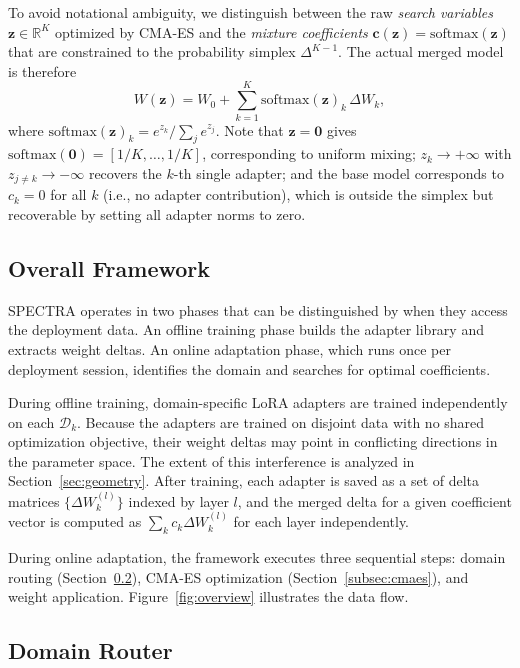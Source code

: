 \documentclass[preprint,12pt]{elsarticle}
\begin{document}
To avoid notational ambiguity, we distinguish between the raw \emph{search
variables} $\mathbf{z} \in \mathbb{R}^K$ optimized by CMA-ES and the
\emph{mixture coefficients} $\mathbf{c}(\mathbf{z}) = \mathrm{softmax}(\mathbf{z})$
that are constrained to the probability simplex $\Delta^{K-1}$. The actual
merged model is therefore
\begin{equation}
    W(\mathbf{z}) = W_0 + \sum_{k=1}^{K} \mathrm{softmax}(\mathbf{z})_k
    \,\Delta W_k,
    \label{eq:merge_z}
\end{equation}
where $\mathrm{softmax}(\mathbf{z})_k = e^{z_k}/\sum_j e^{z_j}$.
Note that $\mathbf{z} = \mathbf{0}$ gives
$\mathrm{softmax}(\mathbf{0}) = [1/K, \ldots, 1/K]$, corresponding to uniform
mixing; $z_k \to +\infty$ with $z_{j\neq k} \to -\infty$ recovers the $k$-th
single adapter; and the base model corresponds to $c_k = 0$ for all $k$
(i.e., no adapter contribution), which is outside the simplex but recoverable
by setting all adapter norms to zero.

\subsection{Overall Framework}
\label{subsec:framework}

SPECTRA operates in two phases that can be distinguished by when they access
the deployment data. An offline training phase builds the adapter library and
extracts weight deltas. An online adaptation phase, which runs once per
deployment session, identifies the domain and searches for optimal coefficients.

During offline training, domain-specific LoRA adapters are trained independently
on each $\mathcal{D}_k$. Because the adapters are trained on disjoint data with
no shared optimization objective, their weight deltas may point in conflicting
directions in the parameter space. The extent of this interference is analyzed
in Section~\ref{sec:geometry}. After training, each adapter is saved as a set
of delta matrices $\{\Delta W_k^{(l)}\}$ indexed by layer $l$, and the merged
delta for a given coefficient vector is computed as
$\sum_k c_k \Delta W_k^{(l)}$ for each layer independently.

During online adaptation, the framework executes three sequential steps: domain
routing (Section~\ref{subsec:router}), CMA-ES optimization
(Section~\ref{subsec:cmaes}), and weight application. Figure~\ref{fig:overview}
illustrates the data flow.

\subsection{Domain Router}
\label{subsec:router}
\end{document}
